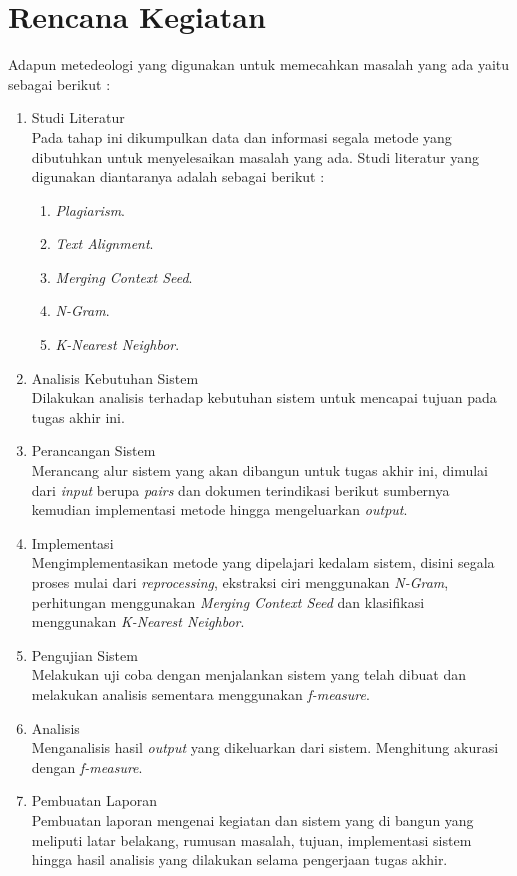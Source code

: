 \documentclass[../Proposal.tex]{subfiles}
\begin{document}
	\section{Rencana Kegiatan}
	\noindent Adapun metedeologi yang digunakan untuk memecahkan masalah yang ada yaitu sebagai berikut :
	\begin{enumerate}
		\item Studi Literatur\\
		Pada tahap ini dikumpulkan data dan informasi segala metode yang dibutuhkan untuk menyelesaikan masalah yang ada. Studi literatur yang digunakan diantaranya adalah sebagai berikut : 
		\begin{enumerate}
			\item \textit{Plagiarism}.
			\item \textit{Text Alignment}.
			\item \textit{Merging Context Seed}.
			\item \textit{N-Gram}.
			\item \textit{K-Nearest Neighbor}.
		\end{enumerate}
		
		\item Analisis Kebutuhan Sistem\\
		Dilakukan analisis terhadap kebutuhan sistem untuk mencapai tujuan pada tugas akhir ini.
		
		\item Perancangan Sistem\\
		Merancang alur sistem yang akan dibangun untuk tugas akhir ini, dimulai dari \textit{input} berupa \textit{pairs} dan dokumen terindikasi berikut sumbernya kemudian implementasi metode hingga mengeluarkan \textit{output}.
		
		\item Implementasi\\
		Mengimplementasikan metode yang dipelajari kedalam sistem, disini segala proses mulai dari \textit{reprocessing}, ekstraksi ciri menggunakan \textit{N-Gram}, perhitungan menggunakan \textit{Merging Context Seed} dan klasifikasi menggunakan \textit{K-Nearest Neighbor}.
		
		\item Pengujian Sistem\\
		Melakukan uji coba dengan menjalankan sistem yang telah dibuat dan melakukan analisis sementara menggunakan \textit{f-measure}.
		
		\item Analisis\\
		Menganalisis hasil \textit{output} yang dikeluarkan dari sistem. Menghitung akurasi dengan \textit{f-measure}.
		
		\item Pembuatan Laporan\\
		Pembuatan laporan mengenai kegiatan dan sistem yang di bangun yang meliputi latar belakang, rumusan masalah, tujuan, implementasi sistem hingga hasil analisis yang dilakukan selama pengerjaan tugas akhir.
	\end{enumerate}
\end{document}
